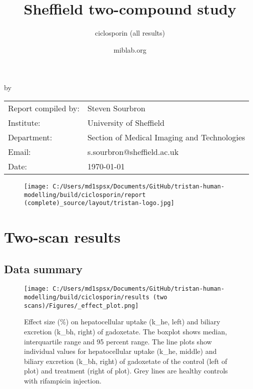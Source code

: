 \documentclass{epflreport}%
\begin{document}
%
\normalsize%
\frontmatter%
\title{Sheffield two{-}compound study}%
\subtitle{ciclosporin (all results)}%
\author{miblab.org}%
\subject{D2.10 {-} Internal report}%
%
%
%
\makecover%
\begin{titlepage}%
\begin{center}%
\makeatletter%
\largetitlestyle\fontsize{45}{45}\selectfont\@title%
\makeatother%
\linebreak%
\makeatletter%
\ifdefvoid{\@subtitle}{}{\bigskip\titlestyle\fontsize{20}{20}\selectfont\@subtitle}%
\makeatother%
\linebreak%
\bigskip%
\bigskip%
by%
\linebreak%
\bigskip%
\bigskip%
\makeatletter%
\largetitlestyle\fontsize{25}{25}\selectfont\@author%
\makeatother%
\vfill%
\large%
\begin{tabular}{ll}%
\hline%
Report compiled by: &Steven Sourbron\\%
Institute: &University of Sheffield\\%
Department: &Section of Medical Imaging and Technologies\\%
Email: &s.sourbron@sheffield.ac.uk\\%
Date: &\today\\%
\hline%
\end{tabular}%


\begin{figure}[b!]%
\centering%
\centering%
\texttt{[image: C:/Users/md1spsx/Documents/GitHub/tristan-human-modelling/build/ciclosporin/report (complete)\_source/layout/tristan-logo.jpg]}%
\end{figure}

%
\end{center}%
\end{titlepage}%
\newpage%
\tableofcontents%
\mainmatter%
\clearpage%
\chapter{Two{-}scan results}%
\section{Data summary}%
\label{sec:Datasummary}%

%


\begin{figure}[h!]%
\centering%
\texttt{[image: C:/Users/md1spsx/Documents/GitHub/tristan-human-modelling/build/ciclosporin/results (two scans)/Figures/\_effect\_plot.png]}%
\caption{Effect size (\%) on hepatocellular uptake (k\_he, left) and biliary excretion (k\_bh, right) of gadoxetate. The boxplot shows median, interquartile range and 95 percent range. The line plots show individual values for hepatocellular uptake (k\_he, middle) and biliary excretion (k\_bh, right) of gadoxetate of the control (left of plot) and treatment (right of plot). Grey lines are healthy controls with rifampicin injection.}%
\end{figure}
\end{document}
